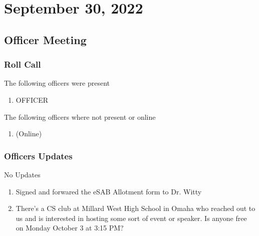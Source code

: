\section{September 30, 2022}
\subsection{Officer Meeting}

\subsubsection{Roll Call}
The following officers were present

\begin{enumerate}
\item OFFICER
\end{enumerate}

The following officers where not present or online

\begin{enumerate}
    \item \tresurer (Online)
\end{enumerate}

\subsubsection{Officers Updates}

\textbf{\president}

No Updates

\textbf{\vicepresident}

\begin{enumerate}
    \item Signed and forwared the eSAB Allotment form to Dr. Witty
    \item There's a CS club at Millard West High School in Omaha who reached out to us and is interested in hosting some sort of event or speaker. Is anyone free on Monday October 3 at 3:15 PM?
\end{enumerate}

\textbf{\tresurer}

